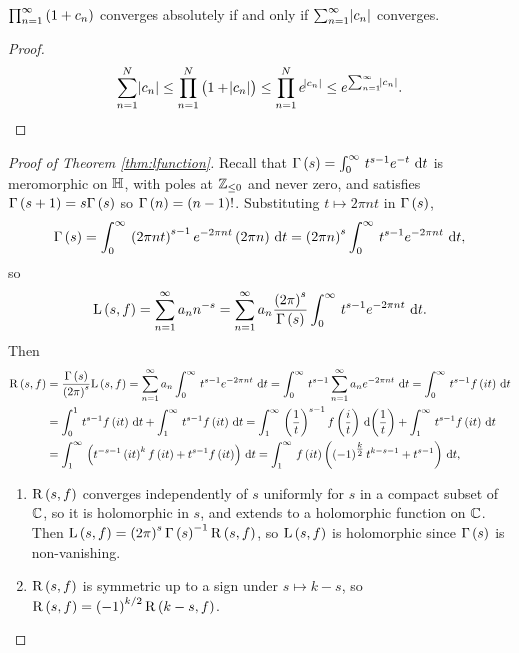 \begin{lemma}
$ \prod_{n = 1}^\infty \br{1 + c_n} $ converges absolutely if and only if $ \sum_{n = 1}^\infty \abs{c_n} $ converges.
\end{lemma}

\begin{proof}
$$ \sum_{n = 1}^N \abs{c_n} \le \prod_{n = 1}^N \br{1 + \abs{c_n}} \le \prod_{n = 1}^N e^{\abs{c_n}} \le e^{\sum_{n = 1}^\infty \abs{c_n}}. $$
\end{proof}

\begin{proof}[Proof of Theorem \ref{thm:lfunction}]
Recall that $ \Gamma\br{s} = \intd{0}{\infty}{t^{s - 1}e^{-t}}{t} $ is meromorphic on $ \mathbb{H} $, with poles at $ \mathbb{Z}_{\le 0} $ and never zero, and satisfies $ \Gamma\br{s + 1} = s\Gamma\br{s} $ so $ \Gamma\br{n} = \br{n - 1}! $. Substituting $ t \mapsto 2\pi nt $ in $ \Gamma\br{s} $,
$$ \Gamma\br{s} = \intd{0}{\infty}{\br{2\pi nt}^{s - 1}e^{-2\pi nt}\br{2\pi n}}{t} = \br{2\pi n}^s\intd{0}{\infty}{t^{s - 1}e^{-2\pi nt}}{t}, $$
so
$$ \L\br{s, f} = \sum_{n = 1}^\infty a_nn^{-s} = \sum_{n = 1}^\infty a_n\dfrac{\br{2\pi}^s}{\Gamma\br{s}}\intd{0}{\infty}{t^{s - 1}e^{-2\pi nt}}{t}. $$
Then
\begin{align*}
\R\br{s, f}
& = \dfrac{\Gamma\br{s}}{\br{2\pi}^s}\L\br{s, f}
= \sum_{n = 1}^\infty a_n\intd{0}{\infty}{t^{s - 1}e^{-2\pi nt}}{t}
= \intd{0}{\infty}{t^{s - 1}\sum_{n = 1}^\infty a_ne^{-2\pi nt}}{t}
= \intd{0}{\infty}{t^{s - 1}f\br{it}}{t} \\
& = \intd{0}{1}{t^{s - 1}f\br{it}}{t} + \intd{1}{\infty}{t^{s - 1}f\br{it}}{t}
= \intd{1}{\infty}{\br{\dfrac{1}{t}}^{s - 1}f\br{\dfrac{i}{t}}}{\br{\dfrac{1}{t}}} + \intd{1}{\infty}{t^{s - 1}f\br{it}}{t} \\
& = \intd{1}{\infty}{\br{t^{-s - 1}\br{it}^kf\br{it} + t^{s - 1}f\br{it}}}{t}
= \intd{1}{\infty}{f\br{it}\br{\br{-1}^{\tfrac{k}{2}}t^{k - s - 1} + t^{s - 1}}}{t},
\end{align*}
\begin{enumerate}
\item $ \R\br{s, f} $ converges independently of $ s $ uniformly for $ s $ in a compact subset of $ \mathbb{C} $, so it is holomorphic in $ s $, and extends to a holomorphic function on $ \mathbb{C} $. Then $ \L\br{s, f} = \br{2\pi}^s\Gamma\br{s}^{-1}\R\br{s, f} $, so $ \L\br{s, f} $ is holomorphic since $ \Gamma\br{s} $ is non-vanishing.
\item $ \R\br{s, f} $ is symmetric up to a sign under $ s \mapsto k - s $, so $ \R\br{s, f} = \br{-1}^{k / 2}\R\br{k - s, f} $.

\end{enumerate}
\end{proof}
